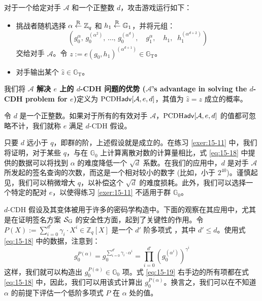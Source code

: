 \begin{game}[$d$-CDH]\label{game:15-3}
对于一个给定对手 $\mathcal{A}$ 和一个正整数 $d$，攻击游戏运行如下：
\begin{itemize}
	\item 挑战者随机选择 $\alpha\overset{\rm R}\leftarrow\mathbb{Z}_q$ 和 $h_1\overset{\rm R}\leftarrow\mathbb{G}_1$，并将元组：
	\begin{equation}\label{eq:15-18}
		\left(g_0^\alpha,\,g_0^{(\alpha^2)},\,\dots,\,g_0^{(\alpha^d)},
		\quad g_1^\alpha,\quad h_1,\;\;h_1^{(\alpha^{d+2})}\right)
    \end{equation}
	交给对手 $\mathcal{A}$。令 $z:=e(g_0,h_1)^{(\alpha^{d+1})}\in\mathbb{G}_\mathrm{T}$。
	\item 对手输出某个 $\hat{z}\in\mathbb{G}_\mathrm{T}$。
\end{itemize}
我们将 \textbf{$\mathcal{A}$ 解决 $e$ 上的 $d$-CDH 问题的优势 ($\mathcal{A}$'s advantage in solving the $d$-CDH problem for $e$)}定义为 ${\rm PCDH\mathsf{adv}}[\mathcal{A},e,d]$，其值为 $\hat{z}=z$ 成立的概率。
\end{game}

\begin{definition}[$d$-CDH 假设]\label{def:15-6}
令 $d$ 是一个正整数。如果对于所有的有效对手 $\mathcal{A}$，${\rm PCDH\mathsf{adv}}[\mathcal{A},e,d]$ 的值都可忽略不计，我们就称 $e$ 满足 $d$-CDH 假设。
\end{definition}

只要 $d$ 远小于 $q$，即群的阶，上述假设就是成立的。在练习 \ref{exer:15-11} 中，我们将证明，对于某些 $q$，与在 $\mathbb{G}_0$ 上计算离散对数的计算量相比，式 \ref{eq:15-18} 中提供的数据可以将找到 $\alpha$ 的难度降低一个 $\sqrt{d}$ 系数。在我们的应用中，$d$ 是对手 $\mathcal{A}$ 所发起的签名查询的次数，而这是一个相对较小的数字 (比如，小于 $2^{40}$)。谨慎起见，我们可以稍微增大 $q$，以补偿这个 $\sqrt{d}$ 的难度损耗。此外，我们可以选择一个特定的配对 $e$，以使得练习 \ref{exer:15-11} 不适用于群 $\mathbb{G}_0$。

$d$-CDH 假设及其变体被用于许多的密码学构造中。下面的观察在其应用中，尤其是在证明签名方案 $\mathcal{S}_{\rm G}$ 的安全性方面，起到了关键性的作用。令 $P(X):=\sum_{i=0}^{d'}\gamma_i\cdot X^i\in\mathbb{Z}_q[X]$ 是一个 $d'$ 阶多项式 ，其中 $d'\leq d$。使用式 \ref{eq:15-18} 中的数据，注意到：
\begin{equation}\label{eq:15-19}
g_0^{P(\alpha)}
=g_0^{\sum_{i=0}^{d'}\gamma_i\cdot\alpha^i}
=\prod_{i=0}^{d'}\left(g_0^{(\alpha^i)}\right)^{\gamma^i}
\end{equation}
这样，我们就可以构造出 $g_0^{P(\alpha)}\in\mathbb{G}_0$ 项。式 \ref{eq:15-19} 右手边的所有项都在式 \ref{eq:15-18} 中，因此，我们可以用该式计算出 $g_0^{P(\alpha)}$。换言之，我们可以在不知道 $\alpha$ 的前提下评估一个低阶多项式 $P$ 在 $\alpha$ 处的值。

